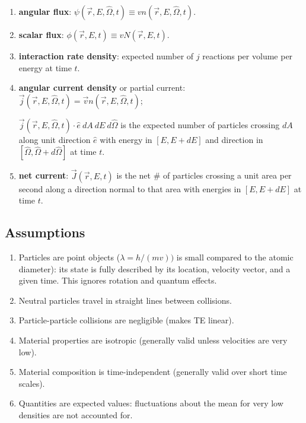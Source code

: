 \documentclass[12pt]{article}
\newif\ifeqns
\newcommand{\vOmega}{\ensuremath{\hat{\Omega}}}
\begin{document}
\begin{enumerate}
\item \textbf{angular flux}: $\psi(\vec{r}, E, \vOmega, t) \equiv v n(\vec{r}, E, \vOmega, t)$.

\item \textbf{scalar flux}: $\phi(\vec{r},E,t) \equiv v N(\vec{r},E,t)$.
%
\ifeqns
\[= \int_{4\pi} d\vOmega\: \psi(\vec{r}, E, \vOmega, t) \]
\else
\vspace*{2em}
\fi

\item \textbf{interaction rate density}: expected number of $j$ reactions per volume per energy at time $t$.
%
\ifeqns
\[\int_{4\pi} d\vOmega \:\Sigma_j v n(\vec{r}, E, \vOmega, t) = \Sigma_j \phi(\vec{r},E,t)\]
\else
\vspace*{2em}
\fi

\item \textbf{angular current density} or partial current: $\vec{j}(\vec{r}, E, \vOmega, t) = \vec{v} n(\vec{r}, E, \vOmega, t)$; 

$\vec{j}(\vec{r}, E, \vOmega, t) \cdot \hat{e}\: dA\: dE\: d\vOmega$ is the expected number of particles crossing $dA$ along unit direction $\hat{e}$ with energy in $[E, E + dE]$ and direction in $[\vOmega, \vOmega + d\vOmega]$ at time $t$.

\item \textbf{net current}: $\vec{J}(\vec{r}, E, t) $ is the net \# of particles crossing a unit area per second along a direction normal to that area with energies in $[E, E + dE]$ at time $t$.
\ifeqns
\[\vec{J}(\vec{r}, E, t) = \int_{4\pi} d\vOmega\: \vOmega \psi(\vec{r}, E, \vOmega, t)\]
\else
\vspace*{2em}
\fi

\end{enumerate}

\subsection*{Assumptions}
\begin{enumerate}
\item Particles are point objects ($\lambda = h/(mv))$ is small compared to the atomic diameter): its state is fully described by its location, velocity vector, and a given time. This ignores rotation and quantum effects.

\item Neutral particles travel in straight lines between collisions.

\item Particle-particle collisions are negligible (makes TE linear).

\item Material properties are isotropic (generally valid unless velocities are very low).

\item Material composition is time-independent (generally valid over short time scales).

\item Quantities are expected values: fluctuations about the mean for very low densities are not accounted for.
\end{enumerate}
\end{document}
